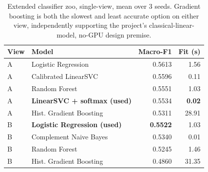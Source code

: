 \begin{table}[H]
\centering
\begin{tabular}{llrr}
\toprule
\textbf{View} & \textbf{Model} & \textbf{Macro-F1} & \textbf{Fit (s)} \\
\midrule
A & Logistic Regression       & 0.5613 & 1.56 \\
A & Calibrated LinearSVC      & 0.5596 & 0.11 \\
A & Random Forest             & 0.5551 & 1.03 \\
A & \textbf{LinearSVC + softmax (used)} & 0.5534 & \textbf{0.02} \\
A & Hist. Gradient Boosting   & 0.5311 & 28.91 \\
\midrule
B & \textbf{Logistic Regression (used)} & \textbf{0.5522} & 1.03 \\
B & Complement Naive Bayes    & 0.5340 & 0.01 \\
B & Random Forest             & 0.5245 & 1.46 \\
B & Hist. Gradient Boosting   & 0.4860 & 31.35 \\
\bottomrule
\end{tabular}
\caption{Extended classifier zoo, single-view, mean over 3 seeds. Gradient
boosting is both the slowest and least accurate option on either view,
independently supporting the project's classical-linear-model, no-GPU
design premise.}
\label{tab:model-zoo}
\end{table}
